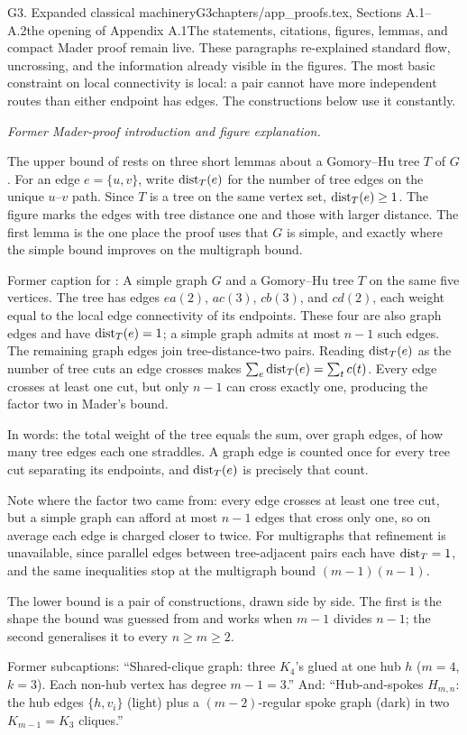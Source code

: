 \begin{offcutrewrite}{G3. Expanded classical machinery}{G3}{chapters/app\_proofs.tex, Sections A.1--A.2}{the opening of Appendix A.1}{The statements, citations, figures, lemmas, and compact Mader proof remain live. These paragraphs re-explained standard flow, uncrossing, and the information already visible in the figures.}
The most basic constraint on local connectivity is local: a pair cannot have more independent routes than either endpoint has edges. The constructions below use it constantly.

\noindent\emph{Former Mader-proof introduction and figure explanation.}

The upper bound of  rests on three short lemmas about a Gomory--Hu tree $T$ of $G$. For an edge $e=\{u,v\}$, write $\operatorname{dist}_T(e)$ for the number of tree edges on the unique $u$--$v$ path. Since $T$ is a tree on the same vertex set, $\operatorname{dist}_T(e)\ge1$. The figure marks the edges with tree distance one and those with larger distance. The first lemma is the one place the proof uses that $G$ is simple, and exactly where the simple bound improves on the multigraph bound.

Former caption for : A simple graph $G$ and a Gomory--Hu tree $T$ on the same five vertices. The tree has edges $ea(2)$, $ac(3)$, $cb(3)$, and $cd(2)$, each weight equal to the local edge connectivity of its endpoints. These four are also graph edges and have $\operatorname{dist}_T(e)=1$; a simple graph admits at most $n-1$ such edges. The remaining graph edges join tree-distance-two pairs. Reading $\operatorname{dist}_T(e)$ as the number of tree cuts an edge crosses makes $\sum_e\operatorname{dist}_T(e)=\sum_t c(t)$. Every edge crosses at least one cut, but only $n-1$ can cross exactly one, producing the factor two in Mader's bound.

In words: the total weight of the tree equals the sum, over graph edges, of how many tree edges each one straddles. A graph edge is counted once for every tree cut separating its endpoints, and $\operatorname{dist}_T(e)$ is precisely that count.

Note where the factor two came from: every edge crosses at least one tree cut, but a simple graph can afford at most $n-1$ edges that cross only one, so on average each edge is charged closer to twice. For multigraphs that refinement is unavailable, since parallel edges between tree-adjacent pairs each have $\operatorname{dist}_T=1$, and the same inequalities stop at the multigraph bound $(m-1)(n-1)$.

The lower bound is a pair of constructions, drawn side by side. The first is the shape the bound was guessed from and works when $m-1$ divides $n-1$; the second generalises it to every $n\ge m\ge2$.

Former subcaptions: ``Shared-clique graph: three $K_4$'s glued at one hub $h$ ($m=4$, $k=3$). Each non-hub vertex has degree $m-1=3$.'' And: ``Hub-and-spokes $H_{m,n}$: the hub edges $\{h,v_i\}$ (light) plus a $(m-2)$-regular spoke graph (dark) in two $K_{m-1}=K_3$ cliques.''


\end{offcutrewrite}
